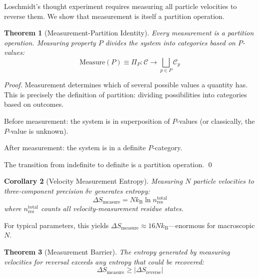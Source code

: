 \documentclass[twocolumn,10pt]{article}
\newtheorem{theorem}{Theorem}[section]
\newtheorem{corollary}[theorem]{Corollary}
\theoremstyle{definition}
\theoremstyle{remark}
\newcommand{\kB}{k_{\mathrm{B}}}
\begin{document}
Loschmidt's thought experiment requires measuring all particle velocities to reverse them. We show that measurement is itself a partition operation.

\begin{theorem}[Measurement-Partition Identity]
\label{thm:measurement}
Every measurement is a partition operation. Measuring property $P$ divides the system into categories based on $P$-values:
\begin{equation}
\text{Measure}(P) \equiv \Pi_P: \mathcal{C} \to \bigsqcup_{p \in P} \mathcal{C}_p
\end{equation}
\end{theorem}

\begin{proof}
Measurement determines which of several possible values a quantity has. This is precisely the definition of partition: dividing possibilities into categories based on outcomes.

Before measurement: the system is in superposition of $P$-values (or classically, the $P$-value is unknown).

After measurement: the system is in a definite $P$-category.

The transition from indefinite to definite is a partition operation. \qed
\end{proof}

\begin{corollary}[Velocity Measurement Entropy]
\label{cor:velocity}
Measuring $N$ particle velocities to three-component precision $\delta v$ generates entropy:
\begin{equation}
\Delta S_{\text{measure}} = N \kB \ln n_{\text{res}}^{\text{total}}
\end{equation}
where $n_{\text{res}}^{\text{total}}$ counts all velocity-measurement residue states.
\end{corollary}

For typical parameters, this yields $\Delta S_{\text{measure}} \approx 16 N \kB$---enormous for macroscopic $N$.

\begin{theorem}[Measurement Barrier]
\label{thm:barrier}
The entropy generated by measuring velocities for reversal exceeds any entropy that could be recovered:
\begin{equation}
\Delta S_{\text{measure}} \geq |\Delta S_{\text{reverse}}|
\end{equation}
\end{theorem}
\end{document}
